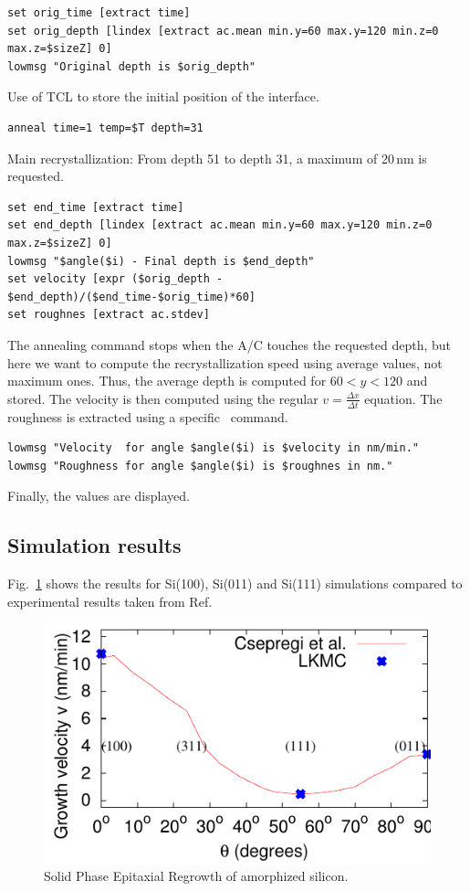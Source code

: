 \begin{lstlisting}[firstnumber=44]
set orig_time [extract time]  
set orig_depth [lindex [extract ac.mean min.y=60 max.y=120 min.z=0 max.z=$sizeZ] 0]
lowmsg "Original depth is $orig_depth"
\end{lstlisting}
Use of TCL to store the initial position of the interface.

\begin{lstlisting}[firstnumber=48]
anneal time=1 temp=$T depth=31
\end{lstlisting}
Main recrystallization: From depth 51 to depth 31, a maximum of 20\,nm is requested.

\begin{lstlisting}[firstnumber=49]
set end_time [extract time]   
set end_depth [lindex [extract ac.mean min.y=60 max.y=120 min.z=0 max.z=$sizeZ] 0]
lowmsg "$angle($i) - Final depth is $end_depth"
set velocity [expr ($orig_depth - $end_depth)/($end_time-$orig_time)*60]
set roughnes [extract ac.stdev]
\end{lstlisting}
The annealing command stops when the A/C touches the requested depth, but here we want to compute the recrystallization speed using average values, not maximum ones. Thus, the average depth is computed for $60 < y < 120$ and stored. The velocity is then computed using the regular $v=\frac{\Delta x}{\Delta t}$ equation. The roughness is extracted using a specific \MMonCa\ command.

\begin{lstlisting}[firstnumber=54]
lowmsg "Velocity  for angle $angle($i) is $velocity in nm/min."
lowmsg "Roughness for angle $angle($i) is $roughnes in nm."
\end{lstlisting}
Finally, the values are displayed.

\subsection{Simulation results}

Fig.~\ref{fig:lkmc-example} shows the results for Si(100), Si(011) and Si(111) simulations compared to experimental results taken from Ref.~\cite{CSEPREGI-JAP78}

\begin{figure}
\begin{center}
\includegraphics{images/csepregi}
\end{center}
\caption{Solid Phase Epitaxial Regrowth of amorphized silicon. \cite{MARTIN-BRAGADO-APL09}}
\label{fig:lkmc-example}
\end{figure}

